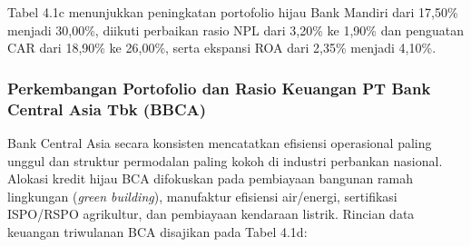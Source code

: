 \documentclass[12pt,a4paper]{article}
\numberwithin{equation}{section}
\begin{document}
\noindent
Tabel 4.1c menunjukkan peningkatan portofolio hijau Bank Mandiri dari 17,50\% menjadi 30,00\%, diikuti perbaikan rasio NPL dari 3,20\% ke 1,90\% dan penguatan CAR dari 18,90\% ke 26,00\%, serta ekspansi ROA dari 2,35\% menjadi 4,10\%.

\subsubsection{Perkembangan Portofolio dan Rasio Keuangan PT Bank Central Asia Tbk (BBCA)}
\noindent
Bank Central Asia secara konsisten mencatatkan efisiensi operasional paling unggul dan struktur permodalan paling kokoh di industri perbankan nasional. Alokasi kredit hijau BCA difokuskan pada pembiayaan bangunan ramah lingkungan (\emph{green building}), manufaktur efisiensi air/energi, sertifikasi ISPO/RSPO agrikultur, dan pembiayaan kendaraan listrik. Rincian data keuangan triwulanan BCA disajikan pada Tabel 4.1d:
\end{document}
